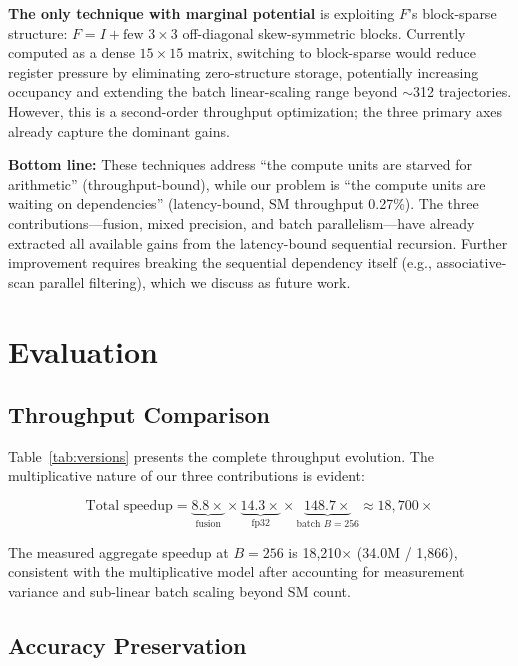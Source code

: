 \documentclass[pdflatex,sn-mathphys-num]{sn-jnl}%
\theoremstyle{thmstyleone}%
\theoremstyle{thmstyletwo}%
\theoremstyle{thmstylethree}%
\begin{document}
\textbf{The only technique with marginal potential} is exploiting $F$'s block-sparse structure: $F = I + \text{few } 3\times3$ off-diagonal skew-symmetric blocks. Currently computed as a dense $15\times15$ matrix, switching to block-sparse would reduce register pressure by eliminating zero-structure storage, potentially increasing occupancy and extending the batch linear-scaling range beyond $\sim$312 trajectories. However, this is a second-order throughput optimization; the three primary axes already capture the dominant gains.

\textbf{Bottom line:} These techniques address ``the compute units are starved for arithmetic'' (throughput-bound), while our problem is ``the compute units are waiting on dependencies'' (latency-bound, SM throughput 0.27\%). The three contributions---fusion, mixed precision, and batch parallelism---have already extracted all available gains from the latency-bound sequential recursion. Further improvement requires breaking the sequential dependency itself (e.g., associative-scan parallel filtering), which we discuss as future work.

\section{Evaluation}\label{sec4}

\subsection{Throughput Comparison}\label{subsec:throughput}

Table~\ref{tab:versions} presents the complete throughput evolution. The multiplicative nature of our three contributions is evident:

\begin{equation}
\text{Total speedup} = \underbrace{8.8\times}_{\text{fusion}} \times \underbrace{14.3\times}_{\text{fp32}} \times \underbrace{148.7\times}_{\text{batch } B=256} \approx 18{,}700\times
\label{eq:multiplicative}
\end{equation}

The measured aggregate speedup at $B=256$ is 18,210$\times$ (34.0M / 1,866), consistent with the multiplicative model after accounting for measurement variance and sub-linear batch scaling beyond SM count.

\subsection{Accuracy Preservation}\label{subsec:accuracy}
\end{document}
